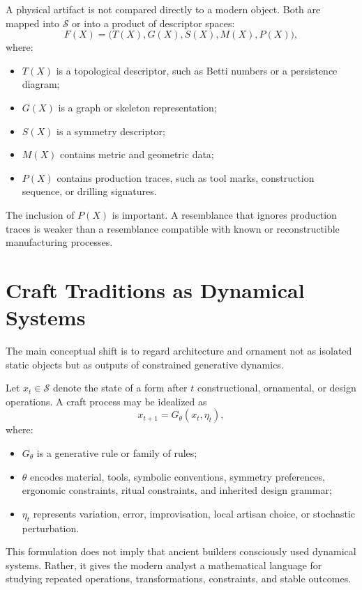 \documentclass[11pt,a4paper]{article}
\begin{document}
A physical artifact is not compared directly to a modern object. Both are mapped into $\mathcal{S}$ or into a product of descriptor spaces:
\begin{equation}
    F(X)=\bigl(T(X),G(X),S(X),M(X),P(X)\bigr),
\end{equation}
where:
\begin{itemize}
    \item $T(X)$ is a topological descriptor, such as Betti numbers or a persistence diagram;
    \item $G(X)$ is a graph or skeleton representation;
    \item $S(X)$ is a symmetry descriptor;
    \item $M(X)$ contains metric and geometric data;
    \item $P(X)$ contains production traces, such as tool marks, construction sequence, or drilling signatures.
\end{itemize}

The inclusion of $P(X)$ is important. A resemblance that ignores production traces is weaker than a resemblance compatible with known or reconstructible manufacturing processes.

\section{Craft Traditions as Dynamical Systems}

The main conceptual shift is to regard architecture and ornament not as isolated static objects but as outputs of constrained generative dynamics.

Let $x_t \in \mathcal{S}$ denote the state of a form after $t$ constructional, ornamental, or design operations. A craft process may be idealized as
\begin{equation}
    x_{t+1}=G_{\theta}(x_t,\eta_t),
\end{equation}
where:
\begin{itemize}
    \item $G_{\theta}$ is a generative rule or family of rules;
    \item $\theta$ encodes material, tools, symbolic conventions, symmetry preferences, ergonomic constraints, ritual constraints, and inherited design grammar;
    \item $\eta_t$ represents variation, error, improvisation, local artisan choice, or stochastic perturbation.
\end{itemize}

This formulation does not imply that ancient builders consciously used dynamical systems. Rather, it gives the modern analyst a mathematical language for studying repeated operations, transformations, constraints, and stable outcomes.
\end{document}
